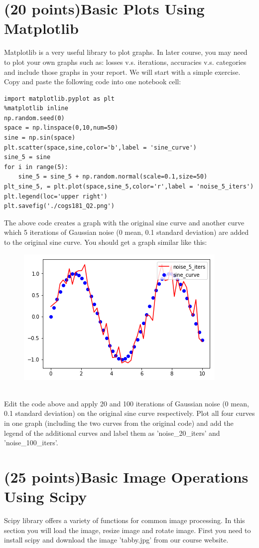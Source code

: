 \documentclass[12pt]{article}%
\begin{document}
\section{(20 points)Basic Plots Using Matplotlib}
Matplotlib is a very useful library to plot graphs. In later course, you may need to plot your own graphs such as: losses v.s. iterations, accuracies v.s. categories and include those graphs in your report. We will start with a simple exercise. Copy and paste the following code into one notebook cell:
\begin{verbatim}
import matplotlib.pyplot as plt
%matplotlib inline
np.random.seed(0)
space = np.linspace(0,10,num=50)
sine = np.sin(space)
plt.scatter(space,sine,color='b',label = 'sine_curve')
sine_5 = sine
for i in range(5):
    sine_5 = sine_5 + np.random.normal(scale=0.1,size=50)
plt_sine_5, = plt.plot(space,sine_5,color='r',label = 'noise_5_iters')
plt.legend(loc='upper right')
plt.savefig('./cogs181_Q2.png')
\end{verbatim}
The above code creates a graph with the original sine curve and another curve which 5 iterations of Gaussian noise (0 mean, 0.1 standard deviation) are added to the original sine curve. You should get a graph similar like this:
\begin{figure}[!htp]
\begin{center}
\includegraphics[width=0.5\linewidth]{Q2.png} 
\label{fig:Q2}
\end{center}
\end{figure}\\
Edit the code above and apply 20 and 100 iterations of Gaussian noise (0 mean, 0.1 standard deviation) on the original sine curve respectively. Plot all four curves in one graph (including the two curves from the original code) and add the legend of the additional curves and label them as 'noise\_20\_iters' and 'noise\_100\_iters'.
\vspace{50mm}

\section{(25 points)Basic Image Operations Using Scipy}
Scipy library offers a variety of functions for common image processing. In this section you will load the image, resize image and rotate image. First you need to install scipy and download the image 'tabby.jpg' from our course website.
\end{document}
